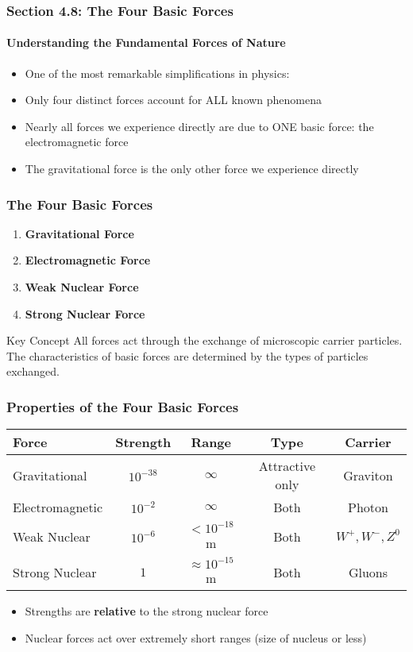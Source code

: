 \documentclass{beamer}
\begin{document}
\begin{frame}
\frametitle{Section 4.8: The Four Basic Forces}
\framesubtitle{Understanding the Fundamental Forces of Nature}
\begin{itemize}
    \item One of the most remarkable simplifications in physics: \pause
    \item \alert{Only four distinct forces account for ALL known phenomena} \pause
    \item Nearly all forces we experience directly are due to ONE basic force: the electromagnetic force \pause
    \item The gravitational force is the only other force we experience directly
\end{itemize}
\end{frame}

\begin{frame}
\frametitle{The Four Basic Forces}
\begin{enumerate}
    \item \textbf{Gravitational Force} \pause
    \item \textbf{Electromagnetic Force} \pause
    \item \textbf{Weak Nuclear Force} \pause
    \item \textbf{Strong Nuclear Force}
\end{enumerate}
\pause
\vspace{1em}
\begin{alertblock}{Key Concept}
All forces act through the exchange of microscopic carrier particles. The characteristics of basic forces are determined by the types of particles exchanged.
\end{alertblock}
\end{frame}

\begin{frame}
\frametitle{Properties of the Four Basic Forces}
\begin{table}
\scriptsize
\begin{tabular}{|l|c|c|c|c|}
\hline
\textbf{Force} & \textbf{Strength} & \textbf{Range} & \textbf{Type} & \textbf{Carrier} \\
\hline
Gravitational & $10^{-38}$ & $\infty$ & Attractive only & Graviton \\
\hline
Electromagnetic & $10^{-2}$ & $\infty$ & Both & Photon \\
\hline
Weak Nuclear & $10^{-6}$ & $< 10^{-18}$ m & Both & $W^+, W^-, Z^0$ \\
\hline
Strong Nuclear & $1$ & $\approx 10^{-15}$ m & Both & Gluons \\
\hline
\end{tabular}
\end{table}
\pause
\vspace{0.5em}
\begin{itemize}
    \item Strengths are \textbf{relative} to the strong nuclear force
    \item Nuclear forces act over extremely short ranges (size of nucleus or less)
\end{itemize}
\end{frame}
\end{document}
